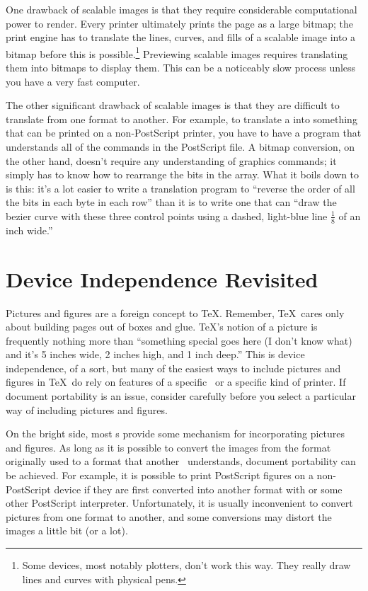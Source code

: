 \newpage
One drawback of scalable images is that they require considerable 
computational power to render.  Every printer ultimately
prints the page as a large bitmap; the print engine has to translate
the lines, curves, and fills of a scalable image into a bitmap
before this is possible.\footnote{Some devices, most notably
plotters, don't work this way.  They really draw lines and curves with
physical pens.}  Previewing scalable images requires 
translating them into bitmaps to display them.
This can be a noticeably slow process unless you have a very fast computer.

The other significant drawback of scalable images is that they are difficult 
to translate
from one format to another.  For example, to translate 
a 
into something that can be printed on a non-PostScript printer, 
you have to have a program that understands all of
the commands in the PostScript file.  A bitmap conversion, on the
other hand, doesn't
require any understanding of graphics commands; it simply has to know
how to rearrange the bits in the array.  What it boils down to is this:
it's a lot easier to write a translation program to ``reverse the
order of all the bits in each byte in each row'' than it is to write
one that can ``draw the bezier curve with these three control points
using a dashed, light-blue line $\frac{1}{8}$ of an inch wide.''

\section{Device Independence Revisited}
\label{sec:devindrev}

Pictures and 
figures are a 
foreign concept to \TeX.  Remember, \TeX\
cares only about building pages out of boxes and glue.  \TeX's notion
of a picture is frequently nothing more than ``something special goes
here (I don't know what) and it's 5 inches wide, 2 inches high, and 1
inch deep.''  This is device independence, of a sort, but many of the
easiest ways to include pictures and figures in \TeX\ do rely on
features of a specific \dvidriver\ or a specific kind of printer.  If
document portability is an issue, consider carefully before you select
a particular way of including pictures and figures.

On the bright side, 
most \dvidriver{}s provide 
some mechanism
for incorporating pictures and figures.  As long as it is possible to
convert the images from the format originally used to a format that
another \dvidriver\ understands, document portability can be achieved.
For example, it is possible to print PostScript figures on a
non-PostScript device if they are first converted into another format with
\program{Ghostscript} or some other PostScript interpreter.
Unfortunately, it is usually
inconvenient to convert pictures from one format to another, and some
conversions may distort the images a little bit (or a
lot).

